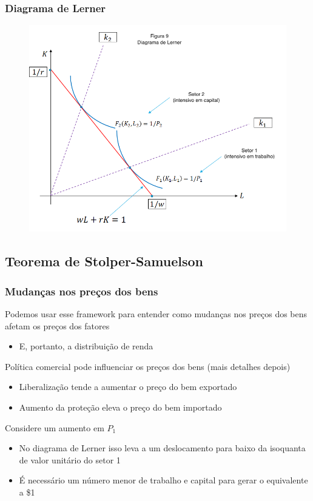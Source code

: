 \documentclass[a4paper,12pt]{article}[abntex2]
\begin{document}
\subsubsection{\textbf{Diagrama de Lerner}}
\begin{figure}[H]
    \centering
    \includegraphics[width=0.7\linewidth]{Imagens/a10i9.png}
\end{figure}

\subsection{\textbf{Teorema de Stolper-Samuelson}}
\subsubsection{\textbf{Mudanças nos preços dos bens}}
Podemos usar esse framework para entender como mudanças nos preços dos bens afetam os preços dos fatores\begin{itemize}
    \item E, portanto, a distribuição de renda
\end{itemize}

Política comercial pode influenciar os preços dos bens (mais detalhes depois)\begin{itemize}
    \item Liberalização tende a aumentar o preço do bem exportado
    \item Aumento da proteção eleva o preço do bem importado
\end{itemize}

Considere um aumento em \( P_1 \)\begin{itemize}
    \item No diagrama de Lerner isso leva a um deslocamento para baixo da isoquanta de valor unitário do setor 1
    \item É necessário um número menor de trabalho e capital para gerar o equivalente a \$1
\end{itemize}
\end{document}
